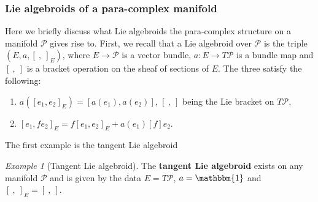 \documentclass[letterpaper,12pt]{article}
\newcommand{\id}{\mathbbm{1}}
\newcommand{\PS}{\mathcal{P}}
\newcommand{\brac}{[\ ,\ ]}
\theoremstyle{definition}
\theoremstyle{remark}
\theoremstyle{examples}
\newtheorem{Ex}[theorem]{Example}
\begin{document}
\subsubsection{Lie algebroids of a para-complex manifold}\label{lie_algds_paracpx}
Here we briefly discuss what Lie algebroids the para-complex structure on a manifold $\PS$ gives rise to.
First, we recall that a Lie algebroid over $\PS$ is the triple $(E,a,\brac_E)$, where $E\rightarrow \PS$ is a vector bundle, $a: E\rightarrow T\PS$ is a bundle map and $\brac$ is a bracket operation on the sheaf of sections of $E$. The three satisfy the following:
\begin{enumerate}
\item $a([e_1,e_2]_E)=[a(e_1),a(e_2)]$, $\brac$ being the Lie bracket on $T\PS$,
\item $[e_1,fe_2]_E=f[e_1,e_2]_E+a(e_1)[f]e_2$.
\end{enumerate}



The first example is the tangent Lie algebroid
\begin{Ex}[Tangent Lie algebroid]\label{ex:tangent_lie}
The {\bf tangent Lie algebroid} exists on any manifold $\PS$ and is given by the data $E=T\PS$, $a=\id$ and $\brac_E=\brac$.
\end{Ex}
\end{document}
